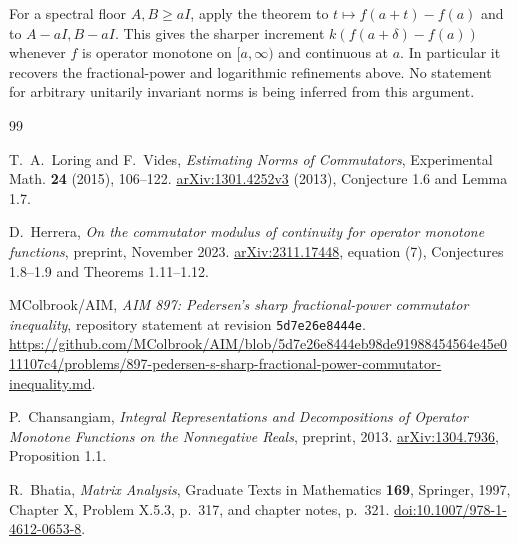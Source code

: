 \documentclass[11pt,a4paper]{article}
\theoremstyle{remark}
\begin{document}
For a spectral floor $A,B\ge aI$, apply the theorem to
$t\mapsto f(a+t)-f(a)$ and to $A-aI,B-aI$. This gives the sharper
increment $k(f(a+\delta)-f(a))$ whenever $f$ is operator monotone on
$[a,\infty)$ and continuous at $a$. In particular it recovers the
fractional-power and logarithmic refinements above. No statement for
arbitrary unitarily invariant norms is being inferred from this argument.



\begin{thebibliography}{99}
\small
\setlength{\itemsep}{3pt}

T.~A.~Loring and F.~Vides,
\emph{Estimating Norms of Commutators},
Experimental Math. \textbf{24} (2015), 106--122.
\href{https://arxiv.org/abs/1301.4252v3}{arXiv:1301.4252v3} (2013),
Conjecture 1.6 and Lemma 1.7.

D.~Herrera,
\emph{On the commutator modulus of continuity for operator monotone functions},
preprint, November 2023.
\href{https://arxiv.org/abs/2311.17448}{arXiv:2311.17448},
equation (7), Conjectures 1.8--1.9 and Theorems 1.11--1.12.

MColbrook/AIM, \emph{AIM 897: Pedersen's sharp fractional-power commutator inequality},
repository statement at revision \texttt{5d7e26e8444e}.
\url{https://github.com/MColbrook/AIM/blob/5d7e26e8444eb98de91988454564e45e011107c4/problems/897-pedersen-s-sharp-fractional-power-commutator-inequality.md}.

P.~Chansangiam,
\emph{Integral Representations and Decompositions of Operator Monotone
Functions on the Nonnegative Reals}, preprint, 2013.
\href{https://arxiv.org/abs/1304.7936}{arXiv:1304.7936}, Proposition 1.1.

R.~Bhatia, \emph{Matrix Analysis}, Graduate Texts in Mathematics
\textbf{169}, Springer, 1997, Chapter X, Problem X.5.3, p.~317,
and chapter notes, p.~321.
\href{https://doi.org/10.1007/978-1-4612-0653-8}{doi:10.1007/978-1-4612-0653-8}.

\end{thebibliography}
\end{document}
